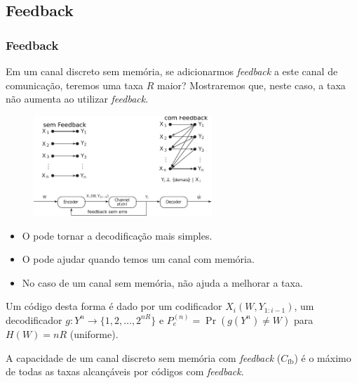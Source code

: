 \subsection{Feedback}
\begin{frame}[allowframebreaks]
  \frametitle{Feedback}
  Em um canal discreto sem memória, se adicionarmos \textit{feedback} a este canal de comunicação, teremos uma taxa $R$ maior? %
  Mostraremos que, neste caso, a taxa não aumenta ao utilizar \textit{feedback}. 

                \begin{figure}[h!]
                \centering
                \includegraphics[width=0.6\textwidth]{images/feedback.pdf}
                \label{fig:feedback}
                \end{figure}

  \begin{itemize}
  \item O  pode tornar a decodificação mais simples.
  \item O  pode ajudar quando temos um canal com memória.
  \item No caso de um canal sem memória,  não ajuda a melhorar a taxa.
  \end{itemize}

  \framebreak

  \begin{definition}
  Um código desta forma é dado por um codificador $X_i(W, Y_{1:i-1})$, um decodificador
  $g: Y^n \rightarrow \{1,2, \ldots, 2^{nR}\}$ e $P_e^{(n)} = \Pr(g(Y^n) \neq W)$ para $H(W) = nR$ (uniforme).
  \end{definition}

  \begin{definition}[Capacidade]
  A capacidade de um canal discreto sem memória com \textit{feedback} ($C_{\text{fb}}$) é o máximo de todas as taxas
  alcançáveis por códigos com \textit{feedback}.
  \end{definition}


\end{frame}
